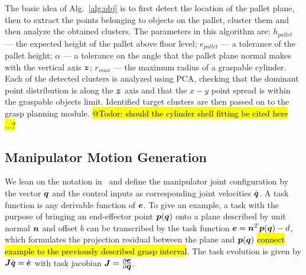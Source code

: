 %
\par
The basic idea of Alg.~\ref{alg:obj} is to first detect the location of the pallet plane, then to
extract the points belonging to objects on the pallet, cluster them and then analyze the obtained
clusters. The parameters in this algorithm are: $h_{pallet}$ --- the expected height of the pallet
above floor level; $e_{pallet}$ --- a tolerance of the pallet height; $\alpha$ --- a tolerance on
the angle that the pallet plane normal makes with the vertical axis $\mbox{\boldmath $z$}$; $r_{max}$ --- the
maximum radius of a graspable cylinder. Each of the detected clusters is analyzed using PCA,
checking that the dominant point distribution is along the $\mbox{\boldmath $z$}$ axis and that the $x-y$ point
spread is within the graspable objects limit. Identified target clusters are then passed on to the
grasp planning module.
%
\hl{@Todor: should the cylinder shell fitting be cited here ...?}~\cite{Pas13}
%
\subsection{Manipulator Motion Generation}
\label{subsec:manip_motion}
%


We lean on the notation in~\cite{Esca14} and define the manipulator joint configuration by the
vector $\mbox{\boldmath $q$}$ and the control inputs as corresponding joint velocities $\dot{\mbox{\boldmath $q$}}$. A task
function is any derivable function of $\mbox{\boldmath $e$}$. To give an example, a task with the purpose of
bringing an end-effector point $\mbox{\boldmath $p$}(\mbox{\boldmath $q$})$ onto a plane described by unit normal $\mbox{\boldmath $n$}$
and offset $b$ can be transcribed by the task function $\mbox{\boldmath $e$}=\mbox{\boldmath $n$}^T\mbox{\boldmath $p$}(\mbox{\boldmath $q$})-d$, which
formulates the projection residual between the plane and $\mbox{\boldmath $p$}(\mbox{\boldmath $q$})$ \hl{connect example to
  the previously described grasp interval}. The task evolution is given by
$\mbox{\boldmath $J$}\dot{\mbox{\boldmath $q$}}=\dot{\mbox{\boldmath $e$}}$ with task jacobian
$\mbox{\boldmath $J$}=\frac{\partial\mbox{\boldmath $e$}}{\partial\mbox{\boldmath $q$}}$.

